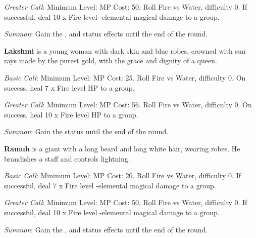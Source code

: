 \begin{multicols}{2}
    \textit{Greater Call}: Minimum Level:  MP Cost: 50. Roll Fire vs Water, difficulty 0. If successful, deal 10 x Fire level -elemental magical damage to a group.
    
	\textit{Summon}: Gain the  ,   and   status effects until the end of the round.

    \ffcrystal[type=level,height=8pt]
    
    \textbf{Lakshmi} is a young woman with dark skin and blue robes, crowned with sun rays made by the purest gold, with the grace and dignity of a queen.

    \textit{Basic Call}: Minimum Level:  MP Cost: 25. Roll Fire vs Water, difficulty 0. On success, heal 7 x Fire level HP to a group.
    
	\textit{Greater Call}: Minimum Level:  MP Cost: 56. Roll Fire vs Water, difficulty 0. On success, heal 10 x Fire level HP to a group.

    \textit{Summon}: Gain the   status until the end of the round.

    \ffcrystal[type=level,height=8pt]

    \textbf{Ramuh} is a giant with a long beard and long white hair, wearing robes. He brandishes a staff and controls lightning.
    
    \textit{Basic Call}: Minimum Level:  MP Cost: 20. Roll Fire vs Water, difficulty 0. If successful, deal 7 x Fire level -elemental magical damage to a group.
    
    \textit{Greater Call}: Minimum Level:  MP Cost: 50. Roll Fire vs Water, difficulty 0. If successful, deal 10 x Fire level -elemental magical damage to a group.
    
    \textit{Summon}: Gain the  ,   and   status effects until the end of the round.

    \ffcrystal[type=level,height=8pt]
    

\end{multicols}
